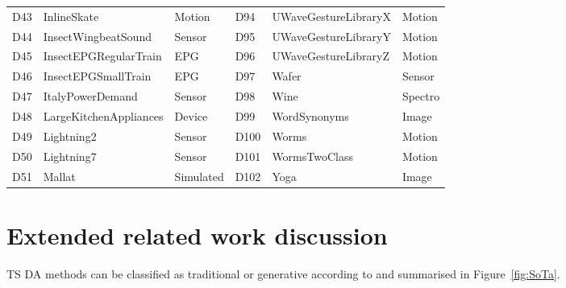 \begin{table}[H]
\begin{tabular}{lll || lll}
D43 & InlineSkate & Motion & D94 & UWaveGestureLibraryX & Motion \\
D44 & InsectWingbeatSound & Sensor & D95 & UWaveGestureLibraryY & Motion \\
D45 & InsectEPGRegularTrain & EPG & D96 & UWaveGestureLibraryZ & Motion \\
D46 & InsectEPGSmallTrain & EPG & D97 & Wafer & Sensor \\
D47 & ItalyPowerDemand & Sensor & D98 & Wine & Spectro \\
D48 & LargeKitchenAppliances & Device & D99 & WordSynonyms & Image \\
D49 & Lightning2 & Sensor & D100 & Worms & Motion \\
D50 & Lightning7 & Sensor & D101 & WormsTwoClass & Motion \\
D51 & Mallat & Simulated & D102 & Yoga & Image \\
\bottomrule
\end{tabular}
\end{table}





\section{Extended related work discussion}
\label{app:related-extended}

TS DA methods can be classified as traditional or
generative according to \citep{iglesias2023data, iwana2021empirical}
and summarised in Figure~\ref{fig:SoTa}.

